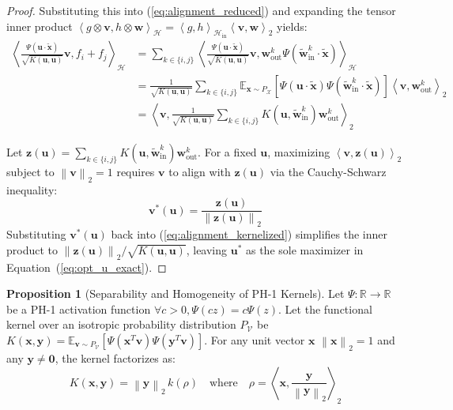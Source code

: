 \documentclass[11pt, a4paper, copyright, gdm]{google}
\newcommand{\norm}[1]{\left\lVert#1\right\rVert}
\newcommand{\inner}[2]{\left\langle#1, #2\right\rangle}
\newcommand{\uVect}{\boldsymbol{u}}
\newcommand{\vVect}{\boldsymbol{v}}
\newcommand{\wVect}{\boldsymbol{w}}
\newcommand{\xVect}{\boldsymbol{x}}
\newcommand{\yVect}{\boldsymbol{y}}
\newcommand{\zVect}{\boldsymbol{z}}
\newcommand{\zeroVect}{\boldsymbol{0}}
\newcommand{\calH}{\mathcal{H}}
\newcommand{\calV}{\mathcal{V}}
\newcommand{\calX}{\mathcal{X}}
\newcommand{\R}{\mathbb{R}}
\newcommand{\E}{\mathbb{E}}
\theoremstyle{definition}
\newtheorem{proposition}[theorem]{Proposition}
\begin{document}
\begin{proof}
Substituting this into (\ref{eq:alignment_reduced}) and expanding the tensor inner product $\inner{g \otimes \vVect}{h \otimes \wVect}_\calH = \inner{g}{h}_{\calH_{\text{in}}} \inner{\vVect}{\wVect}_2$ yields:
\begin{align}
    \inner{\frac{\Psi(\uVect \cdot \tilde{\xVect})}{\sqrt{K(\uVect,\uVect)}} \vVect}{f_i + f_j}_\calH &= \sum_{k \in \{i,j\}} \inner{\frac{\Psi(\uVect \cdot \tilde{\xVect})}{\sqrt{K(\uVect,\uVect)}} \vVect}{\wVect^k_{\text{out}} \Psi(\tilde{\wVect}^k_{\text{in}} \cdot \tilde{\xVect}) }_\calH \nonumber \\
    &= \frac{1}{\sqrt{K(\uVect,\uVect)}} \sum_{k \in \{i,j\}} \E_{\xVect \sim P_\calX} \left[ \Psi(\uVect \cdot \tilde{\xVect}) \Psi(\tilde{\wVect}^k_{\text{in}} \cdot \tilde{\xVect}) \right] \inner{\vVect}{\wVect^k_{\text{out}}}_2 \nonumber \\
    \label{eq:alignment_kernelized}
    &= \inner{\vVect}{\frac{1}{\sqrt{K(\uVect,\uVect)}} \sum_{k \in \{i,j\}} K(\uVect, \tilde{\wVect}^k_{\text{in}}) \wVect^k_{\text{out}}}_2
\end{align}

Let $\zVect(\uVect) = \sum_{k \in \{i,j\}} K(\uVect, \tilde{\wVect}^k_{\text{in}}) \wVect^k_{\text{out}}$. For a fixed $\uVect$, maximizing $\inner{\vVect}{\zVect(\uVect)}_2$ subject to $\norm{\vVect}_2 = 1$ requires $\vVect$ to align with $\zVect(\uVect)$ via the Cauchy-Schwarz inequality:
\begin{equation*}
    \vVect^*(\uVect) = \frac{\zVect(\uVect)}{\norm{\zVect(\uVect)}_2} 
\end{equation*}
Substituting $\vVect^*(\uVect)$ back into (\ref{eq:alignment_kernelized}) simplifies the inner product to $\norm{\zVect(\uVect)}_2 / \sqrt{K(\uVect,\uVect)}$, leaving $\uVect^*$ as the sole maximizer in Equation~(\ref{eq:opt_u_exact}).
\end{proof}

\begin{proposition}[Separability and Homogeneity of PH-1 Kernels]
\label{prop:separability_kernel}
Let $\Psi: \R \to \R$ be a PH-1 activation function $\forall c>0, \Psi(cz) = c\Psi(z)$. Let the functional kernel over an isotropic probability distribution $P_{\calV}$ be $K(\xVect, \yVect) = \E_{\vVect \sim P_{\calV}} [\Psi(\xVect^T \vVect) \Psi(\yVect^T \vVect)]$. For any unit vector $\xVect$ $\norm{\xVect}_2=1$ and any $\yVect \neq \zeroVect$, the kernel factorizes as:
\begin{equation}
    K(\xVect, \yVect) = \norm{\yVect}_2\, k(\rho) \quad \text{where} \quad \rho = \inner{\xVect}{\frac{\yVect}{\norm{\yVect}_2}}_2
\end{equation}
\end{proposition}
\end{document}
